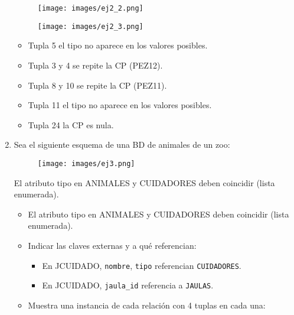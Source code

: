 \begin{enumerate}
    \begin{figure}[H]
        \centering
        \texttt{[image: images/ej2\_2.png]}
        \label{fig:ej2RelB}
    \end{figure}
    \begin{figure}[H]
        \centering
        \texttt{[image: images/ej2\_3.png]}
        \label{fig:ej2RelB2}
    \end{figure}
    \begin{itemize}
        \item Tupla 5 el tipo no aparece en los valores posibles.
        \item Tupla 3 y 4 se repite la CP (PEZ12).
        \item Tupla 8 y 10 se repite la CP (PEZ11).
        \item Tupla 11 el tipo no aparece en los valores posibles.
        \item Tupla 24 la CP es nula.
    \end{itemize}
    \item Sea el siguiente esquema de una BD de animales de un zoo:
    \begin{figure}[H]
        \centering
        \texttt{[image: images/ej3.png]}
        \label{fig:ej3RelB}
    \end{figure}
    El atributo tipo en ANIMALES y CUIDADORES deben coincidir (lista enumerada).
    \begin{itemize}
        \item El atributo tipo en ANIMALES y CUIDADORES deben coincidir (lista enumerada).
        \item Indicar las claves externas y a qué referencian:
        \begin{itemize}
            \item En JCUIDADO, \texttt{nombre}, \texttt{tipo} referencian \texttt{CUIDADORES}.
            \item En JCUIDADO, \texttt{jaula\_id} referencia a \texttt{JAULAS}.
        \end{itemize}
        \item Muestra una instancia de cada relación con 4 tuplas en cada una:
    \end{itemize}


\end{enumerate}

